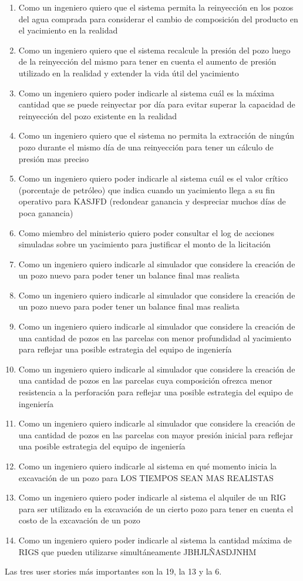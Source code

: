 \begin{enumerate}
  \item Como un ingeniero quiero que el sistema permita la reinyección en los pozos del agua comprada para considerar el cambio de composición del producto en el yacimiento en la realidad
  \item Como un ingeniero quiero que el sistema recalcule la presión del pozo luego de la reinyección del mismo para tener en cuenta el aumento de presión utilizado en la realidad y extender la vida útil del yacimiento 
  \item Como un ingeniero quiero poder indicarle al sistema cuál es la máxima cantidad que se puede reinyectar por día para evitar superar la capacidad de reinyección del pozo existente en la realidad
  \item Como un ingeniero quiero que el sistema no permita la extracción de ningún pozo durante el mismo día de una reinyección para tener un cálculo de presión mas preciso
  \item Como un ingeniero quiero poder indicarle al sistema cuál es el valor crítico (porcentaje de petróleo) que indica cuando un yacimiento llega a su fin operativo para KASJFD (redondear ganancia y despreciar muchos días de poca ganancia)
  \item Como miembro del ministerio quiero poder consultar el log de acciones simuladas sobre un yacimiento para justificar el monto de la licitación 
  \item Como un ingeniero quiero indicarle al simulador que considere la creación de un pozo nuevo para poder tener un balance final mas realista
  \item Como un ingeniero quiero indicarle al simulador que considere la creación de un pozo nuevo para poder tener un balance final mas realista
  \item Como un ingeniero quiero indicarle al simulador que considere la creación de una cantidad de pozos en las parcelas con menor profundidad al yacimiento para reflejar una posible estrategia del equipo de ingeniería
  \item Como un ingeniero quiero indicarle al simulador que considere la creación de una cantidad de pozos en las parcelas cuya composición ofrezca menor resistencia a la perforación para reflejar una posible estrategia del equipo de ingeniería
  \item Como un ingeniero quiero indicarle al simulador que considere la creación de una cantidad de pozos en las parcelas con mayor presión inicial para reflejar una posible estrategia del equipo de ingeniería
  \item Como un ingeniero quiero indicarle al sistema en qué momento inicia la excavación de un pozo para LOS TIEMPOS SEAN MAS REALISTAS
  \item Como un ingeniero quiero poder indicarle al sistema el alquiler de un RIG para ser utilizado en la excavación de un cierto pozo para tener en cuenta el costo de la excavación de un pozo
  \item Como un ingeniero quiero poder indicarle al sistema la cantidad máxima de RIGS que pueden utilizarse simultáneamente JBHJLÑASDJNHM



\end{enumerate}

Las tres user stories m\'as importantes son la 19, la 13 y la 6.

